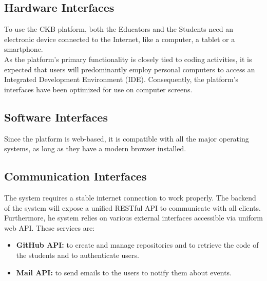 
\subsection{Hardware Interfaces}
To use the CKB platform, both the Educators and the Students need an electronic device connected to the Internet, like a computer, a tablet or a smartphone.\\
As the platform's primary functionality is closely tied to coding activities, it is expected that users will predominantly employ personal computers to access an Integrated Development Environment (IDE). Consequently, the platform's interfaces have been optimized for use on computer screens.

\subsection{Software Interfaces}
Since the platform is web-based, it is compatible with all the major operating systems, as long as they have a modern browser installed.

\subsection{Communication Interfaces}
The system requires a stable internet connection to work properly. The backend of the system will expose a unified RESTful API to communicate with all clients.\\
Furthermore, he system relies on various external interfaces accessible via uniform web API. These services are:
\begin{itemize}
    \item \textbf{GitHub API:} to create and manage repositories and to retrieve the code of the students and to authenticate users.
    \item \textbf{Mail API:} to send emails to the users to notify them about events.
\end{itemize}

